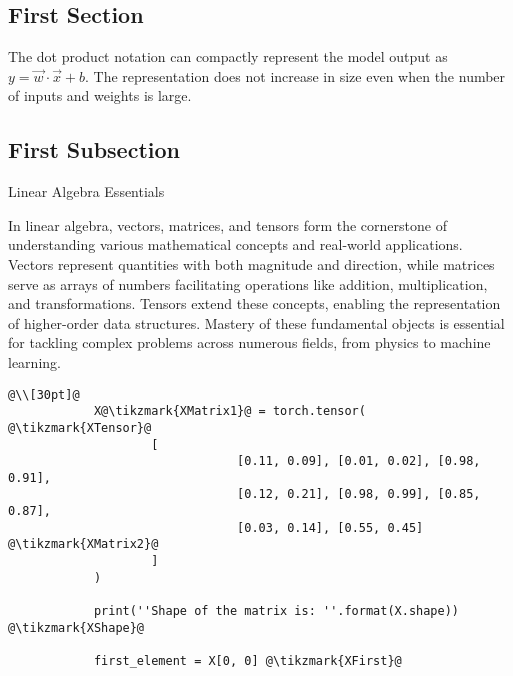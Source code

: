 \documentclass[a4paper,twoside,openany]{book}
\begin{document}
	\begin{spacing}{1.5}
		\section{First Section}
		\kant[1]
		\begin{ManNote}
			The dot product notation can compactly represent the model output as 
			$y = \overrightarrow{w}\cdot\overrightarrow{x}+b$.  The representation 									does not increase in size even when the number of inputs and weights is large.
		\end{ManNote} 
		\kant[1]
		
		\subsection{First Subsection}
		\kant[1] 
		
		\begin{ManHighlight}{Linear Algebra Essentials}
			\par\noindent In linear algebra, vectors, matrices, and tensors form the 								cornerstone of understanding various mathematical concepts and real-world applications. 				Vectors represent quantities with both magnitude and direction, while matrices serve as 				arrays of numbers facilitating operations like addition, multiplication, and 							transformations. Tensors extend these concepts, enabling the representation of higher-order 			data structures. Mastery of these fundamental objects is essential for tackling complex 				problems across numerous fields, from physics to machine learning.
		\end{ManHighlight} 
		
		\kant[1]
		
		\begin{lstlisting}[caption= Introducting Matrices via PyTorch]
			@\\[30pt]@
			X@\tikzmark{XMatrix1}@ = torch.tensor( @\tikzmark{XTensor}@
					[
								[0.11, 0.09], [0.01, 0.02], [0.98, 0.91],
								[0.12, 0.21], [0.98, 0.99], [0.85, 0.87],
								[0.03, 0.14], [0.55, 0.45] @\tikzmark{XMatrix2}@
					]
			)
			
			print(''Shape of the matrix is: ''.format(X.shape)) @\tikzmark{XShape}@
			
			first_element = X[0, 0] @\tikzmark{XFirst}@
			

\end{lstlisting}
\end{spacing}
\end{document}
